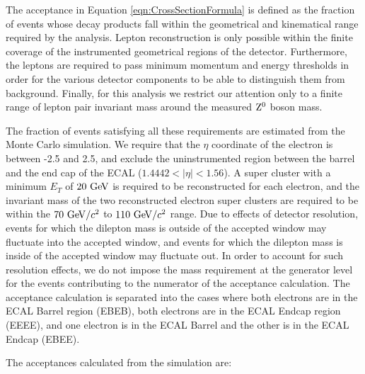 \documentclass{cmspaper}
\begin{document}
\label{sec:acceptance}
The acceptance in Equation \ref{eqn:CrossSectionFormula} is defined as the fraction of \Z\To\Lepp\Lepm events whose decay products fall within the geometrical and kinematical range required by the analysis. Lepton reconstruction is only possible within the finite coverage of the instrumented geometrical regions of the detector. Furthermore, the leptons are required to pass minimum momentum and energy thresholds in order for the various detector components to be able to distinguish them from background. Finally, for this analysis we restrict our attention only to a finite range of lepton pair invariant mass around the measured $\mathrm{Z^0}$ boson mass. 

The fraction of events satisfying all these requirements are estimated from the Monte Carlo simulation. We require that the $\eta$ coordinate of the electron is between -2.5 and 2.5, and exclude the uninstrumented region between the barrel and the end cap of the ECAL ($1.4442 < |\eta| < 1.56$). A super cluster with a minimum $E_{T}$ of $20\ \mathrm{Ge\kern -0.1em V}$ is required to be reconstructed for each electron, and the invariant mass of the two reconstructed electron super clusters are required to be within the $70\ \mathrm{Ge\kern -0.1em V/}c^2$ to $110\ \mathrm{Ge\kern -0.1em V/}c^2$ range. Due to effects of detector resolution, events for which the dilepton mass is outside of the accepted window may fluctuate into the accepted window, and events for which the dilepton mass is inside of the accepted window may fluctuate out. In order to account for such resolution effects, we do not impose the mass requirement at the generator level for the events contributing to the numerator of the acceptance calculation. The acceptance calculation is separated into the cases where both electrons are in the ECAL Barrel region (EBEB), both electrons are in the ECAL Endcap region (EEEE), and one electron is in the ECAL Barrel and the other is in the ECAL Endcap (EBEE).



The acceptances calculated from the simulation are:
\end{document}
